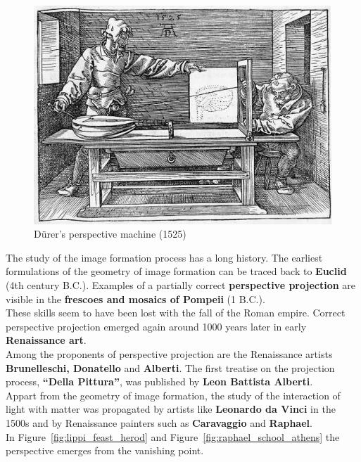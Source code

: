 \begin{figure}[h]
\centering
\includegraphics[width=\columnwidth]{img/durer_perspective_machine.jpg}
\caption{D\"urer's perspective machine (1525)}%
\label{fig:durer_perspective_machine}
\end{figure}

The study of the image formation process has a long history.
The earliest formulations of the geometry of image formation
can be traced back to \textbf{Euclid} (4th century B.C.).
Examples of a partially correct \textbf{perspective projection}
are visible in the \textbf{frescoes and mosaics of Pompeii} (1 B.C.).\\

These skills seem to have been lost with the fall of the Roman empire.
Correct perspective projection emerged again around 1000 years later
in early \textbf{Renaissance art}.\\

Among the proponents of perspective projection are the
Renaissance artists \textbf{Brunelleschi, Donatello} and \textbf{Alberti}.
The first treatise on the projection process, \textbf{``Della Pittura''},
was published by \textbf{Leon Battista Alberti}.\\

Appart from the geometry of image formation, the study of the
interaction of light with matter was propagated by artists like
\textbf{Leonardo da Vinci} in the 1500s and by Renaissance painters
such as \textbf{Caravaggio} and \textbf{Raphael}.\\

In Figure~\ref{fig:lippi_feast_herod} and Figure~\ref{fig:raphael_school_athens}
the perspective emerges from the vanishing point.

